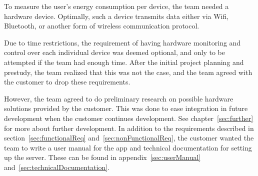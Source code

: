 \noindent To measure the user's energy consumption per device, the team needed a hardware device. Optimally, such a device transmits  data either via Wifi, Bluetooth, or another form of wireless communication protocol.

Due to time restrictions, the requirement of having hardware monitoring and control over each individual device was deemed optional, and only to be attempted if the team had enough time. After the initial project planning and prestudy, the team realized that this was not the case, and the team agreed with the customer to drop these requirements. 

However, the team agreed to do preliminary research on possible hardware solutions provided by the customer. This was done to ease integration in future development when the customer continues development. See chapter~\ref{sec:further} for more about further development. In addition to the requirements described in section~\ref{sec:functionalReq} and~\ref{sec:nonFunctionalReq}, the customer wanted the team to write a user manual for the app and technical documentation for setting up the server. These can be found in appendix~\ref{sec:userManual} and~\ref{sec:technicalDocumentation}.
\newpage
 
